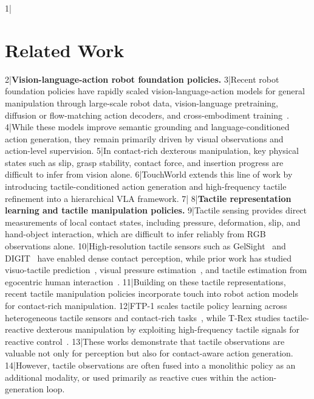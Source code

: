 1|\section{Related Work}
2|\noindent\textbf{Vision-language-action robot foundation policies.}
3|Recent robot foundation policies have rapidly scaled vision-language-action models for general manipulation through large-scale robot data, vision-language pretraining, diffusion or flow-matching action decoders, and cross-embodiment training~\cite{intelligence2025pi05visionlanguageactionmodelopenworld,nvidia2025gr00tn1openfoundation,liu2025rdt1bdiffusionfoundationmodel,wang2026qwenvlaunifyingvisionlanguageactionmodeling}.
4|While these models improve semantic grounding and language-conditioned action generation, they remain primarily driven by visual observations and action-level supervision.
5|In contact-rich dexterous manipulation, key physical states such as slip, grasp stability, contact force, and insertion progress are difficult to infer from vision alone.
6|TouchWorld extends this line of work by introducing tactile-conditioned action generation and high-frequency tactile refinement into a hierarchical VLA framework.
7|
8|\noindent\textbf{Tactile representation learning and tactile manipulation policies.}
9|Tactile sensing provides direct measurements of local contact states, including pressure, deformation, slip, and hand-object interaction, which are difficult to infer reliably from RGB observations alone.
10|High-resolution tactile sensors such as GelSight~\cite{yuan2017gelsight} and DIGIT~\cite{lambeta2020digit} have enabled dense contact perception, while prior work has studied visuo-tactile prediction~\cite{li2019visgel}, visual pressure estimation~\cite{yang2022pressurevision,grady2024pressurevision++}, and tactile estimation from egocentric human interaction~\cite{zhou2026touchanythingdatasetframeworkbimanual}.
11|Building on these tactile representations, recent tactile manipulation policies incorporate touch into robot action models for contact-rich manipulation.
12|FTP-1 scales tactile policy learning across heterogeneous tactile sensors and contact-rich tasks~\cite{yuan2026ftp1generalistfoundationtactile}, while T-Rex studies tactile-reactive dexterous manipulation by exploiting high-frequency tactile signals for reactive control~\cite{niu2026trextactilereactivedexterousmanipulation}.
13|These works demonstrate that tactile observations are valuable not only for perception but also for contact-aware action generation.
14|However, tactile observations are often fused into a monolithic policy as an additional modality, or used primarily as reactive cues within the action-generation loop.

